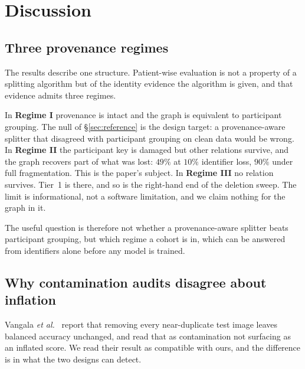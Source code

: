 \documentclass[pdflatex,sn-vancouver-num]{sn-jnl}
\newcommand{\etal}{\textit{et al.}}
\begin{document}
\section{Discussion}
\label{sec:discussion}

\subsection{Three provenance regimes}
\label{sec:regimes}

The results describe one structure. Patient-wise evaluation is not a property of
a splitting algorithm but of the identity evidence the algorithm is given, and
that evidence admits three regimes.

In \textbf{Regime I} provenance is intact and the graph is equivalent to
participant grouping. The null of \S\ref{sec:reference} is the design target: a
provenance-aware splitter that disagreed with participant grouping on clean data
would be wrong. In \textbf{Regime II} the participant key is damaged but other
relations survive, and the graph recovers part of what was lost: $49\%$ at
$10\%$ identifier loss, $90\%$ under full fragmentation. This is the paper's
subject. In \textbf{Regime III} no relation survives. Tier~1 is there, and so is
the right-hand end of the deletion sweep. The limit is informational, not a
software limitation, and we claim nothing for the graph in it.

The useful question is therefore not whether a provenance-aware splitter beats
participant grouping, but which regime a cohort is in, which can be answered
from identifiers alone before any model is trained.

\subsection{Why contamination audits disagree about inflation}
\label{sec:audits_disagree}

Vangala \etal~\cite{scoresthathold2026} report that removing every near-duplicate
test image leaves balanced accuracy unchanged, and read that as contamination
not surfacing as an inflated score. We read their result as compatible with
ours, and the difference is in what the two designs can detect.
\end{document}
